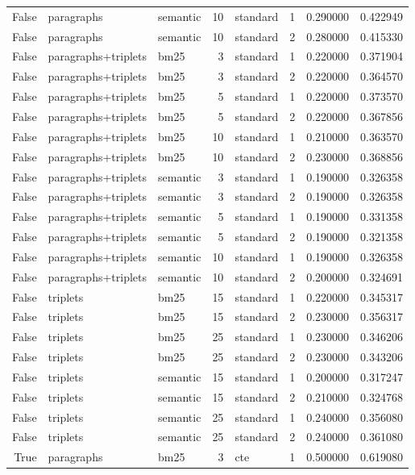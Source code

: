 \begin{tabular}{rllrlrrr}
False & paragraphs & semantic & 10 & standard & 1 & 0.290000 & 0.422949 \\
False & paragraphs & semantic & 10 & standard & 2 & 0.280000 & 0.415330 \\
False & paragraphs+triplets & bm25 & 3 & standard & 1 & 0.220000 & 0.371904 \\
False & paragraphs+triplets & bm25 & 3 & standard & 2 & 0.220000 & 0.364570 \\
False & paragraphs+triplets & bm25 & 5 & standard & 1 & 0.220000 & 0.373570 \\
False & paragraphs+triplets & bm25 & 5 & standard & 2 & 0.220000 & 0.367856 \\
False & paragraphs+triplets & bm25 & 10 & standard & 1 & 0.210000 & 0.363570 \\
False & paragraphs+triplets & bm25 & 10 & standard & 2 & 0.230000 & 0.368856 \\
False & paragraphs+triplets & semantic & 3 & standard & 1 & 0.190000 & 0.326358 \\
False & paragraphs+triplets & semantic & 3 & standard & 2 & 0.190000 & 0.326358 \\
False & paragraphs+triplets & semantic & 5 & standard & 1 & 0.190000 & 0.331358 \\
False & paragraphs+triplets & semantic & 5 & standard & 2 & 0.190000 & 0.321358 \\
False & paragraphs+triplets & semantic & 10 & standard & 1 & 0.190000 & 0.326358 \\
False & paragraphs+triplets & semantic & 10 & standard & 2 & 0.200000 & 0.324691 \\
False & triplets & bm25 & 15 & standard & 1 & 0.220000 & 0.345317 \\
False & triplets & bm25 & 15 & standard & 2 & 0.230000 & 0.356317 \\
False & triplets & bm25 & 25 & standard & 1 & 0.230000 & 0.346206 \\
False & triplets & bm25 & 25 & standard & 2 & 0.230000 & 0.343206 \\
False & triplets & semantic & 15 & standard & 1 & 0.200000 & 0.317247 \\
False & triplets & semantic & 15 & standard & 2 & 0.210000 & 0.324768 \\
False & triplets & semantic & 25 & standard & 1 & 0.240000 & 0.356080 \\
False & triplets & semantic & 25 & standard & 2 & 0.240000 & 0.361080 \\
True & paragraphs & bm25 & 3 & cte & 1 & 0.500000 & 0.619080 \\

\end{tabular}

